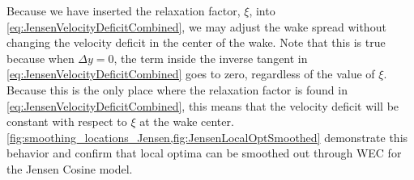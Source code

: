 \documentclass[a4paper]{jpconf}
\begin{document}
Because we have inserted the relaxation factor, $\xi$, into \cref{eq:JensenVelocityDeficitCombined}, we may adjust the wake spread without changing the velocity deficit in the center of the wake. Note that this is true because when $\Delta y = 0$, the term inside the inverse tangent in \cref{eq:JensenVelocityDeficitCombined} goes to zero, regardless of the value of $\xi$. Because this is the only place where the relaxation factor is found in \cref{eq:JensenVelocityDeficitCombined}, this means that the velocity deficit will be constant with respect to $\xi$ at the wake center. \cref{fig:smoothing_locations_Jensen,fig:JensenLocalOptSmoothed} demonstrate this behavior and confirm that local optima can be smoothed out through WEC for the Jensen Cosine model.

\end{document}
